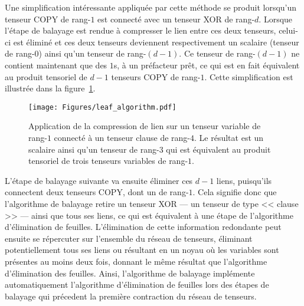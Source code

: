 Une simplification intéressante appliquée par cette méthode se produit lorsqu'un tenseur COPY de rang-$1$ est connecté avec un tenseur XOR de rang-$d$.
Lorsque l'étape de balayage est rendue à compresser le lien entre ces deux tenseurs, celui-ci est éliminé et ces deux tenseurs deviennent respectivement un scalaire (tenseur de rang-$0$) ainsi qu'un tenseur de rang-$(d - 1)$.
Ce tenseur de rang-$(d - 1)$ ne contient maintenant que des $1$s, à un préfacteur prêt, ce qui est en fait équivalent au produit tensoriel de $d - 1$ tenseurs COPY de rang-$1$.
Cette simplification est illustrée dans la figure~\ref{fig:degree1_sweep}.
\begin{figure}[h]
    \centering
    \texttt{[image: Figures/leaf\_algorithm.pdf]}
    \caption[Application de la compression de lien sur un tenseur variable de rang-$1$ connecté à un tenseur clause de rang-$4$.]{Application de la compression de lien sur un tenseur variable de rang-$1$ connecté à un tenseur clause de rang-$4$. Le résultat est un scalaire ainsi qu'un tenseur de rang-$3$ qui est équivalent au produit tensoriel de trois tenseurs variables de rang-$1$.}
    \label{fig:degree1_sweep}
\end{figure}
L'étape de balayage suivante va ensuite éliminer ces $d-1$ liens, puisqu'ils connectent deux tenseurs COPY, dont un de rang-$1$.
Cela signifie donc que l'algorithme de balayage retire un tenseur XOR --- un tenseur de type << clause >> --- ainsi que tous ses liens, ce qui est équivalent à une étape de l'algorithme d'élimination de feuilles.
L'élimination de cette information redondante peut ensuite se répercuter sur l'ensemble du réseau de tenseurs, éliminant potentiellement tous ses liens ou résultant en un noyau où les variables sont présentes au moins deux fois, donnant le même résultat que l'algorithme d'élimination des feuilles.
Ainsi, l'algorithme de balayage implémente automatiquement l'algorithme d'élimination de feuilles lors des étapes de balayage qui précedent la première contraction du réseau de tenseurs.



